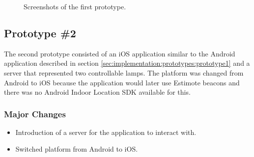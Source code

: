 \begin{figure}[!htb]%
    \centering
    \caption{Screenshots of the first prototype.}
    \label{fig:prototype1-app-screenshots}
\end{figure}


\subsection{Prototype \#2}
\label{sec:implementation:prototypes:prototype2}

The second prototype consisted of an iOS application similar to the Android application described in section \ref{sec:implementation:prototypes:prototype1} and a server that represented two controllable lamps.
The platform was changed from Android to iOS because the application would later use Estimote beacons and there was no Android Indoor Location SDK available for this. 

\subsubsection{Major Changes}
\begin{itemize}
    \item Introduction of a server for the application to interact with.
    \item Switched platform from Android to iOS.
\end{itemize}

